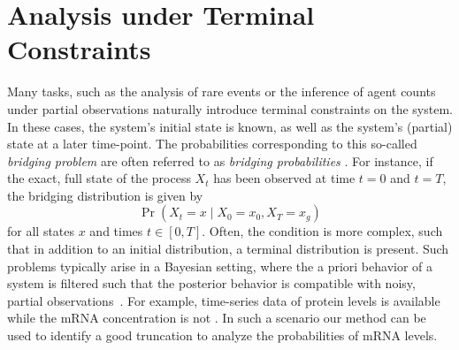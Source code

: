 \chapter{Analysis under Terminal Constraints}\label{sec:bridging}
Many tasks, such as the analysis of rare events or the inference of agent counts under partial observations naturally introduce terminal constraints on the system.
In these cases, the system's initial state is known, as well as the system's (partial) state at a later time-point.
The probabilities corresponding to this so-called \emph{bridging problem} are often referred to as \emph{bridging probabilities} \cite{golightly2019efficient,golightly2011bayesian}.
For instance, if the exact, full state of the process $X_t$ has been observed at time $t=0$ and $t=T$, the bridging distribution is given by
$$\Pr(X_t=x\mid X_{0}=x_{0},X_{T}=x_g)$$
for all states $x$ and times $t\in [0,T]$.
Often, the condition is more complex, such that in addition to an initial distribution, a terminal distribution is present.
Such problems typically arise in a Bayesian setting, where the a priori behavior of a system is filtered such that the posterior behavior is compatible with noisy, partial observations~\cite{broemeling2017bayesian,huang2016reconstructing}.
For example, time-series data of protein levels is available while the mRNA concentration is not  \cite{adan2017flow,huang2016reconstructing}.
In such a scenario our method can be used to identify a good truncation to analyze the probabilities of mRNA levels.


